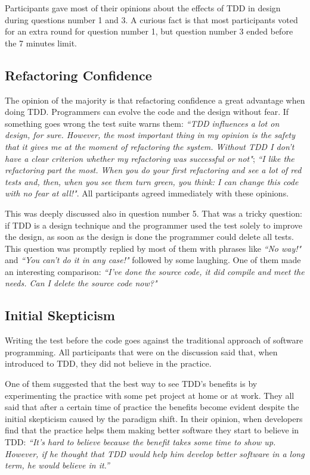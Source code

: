 Participants gave most of their opinions about the effects of TDD in design 
during questions number 1 and 3. 
A curious fact is that most participants voted for an extra round for
question number 1, but question number 3 ended before the 7 minutes limit.

\subsection{Refactoring Confidence}

The opinion of the majority is that refactoring confidence a great advantage
when doing TDD. Programmers can evolve the code and the design without fear. 
If something goes
wrong the test suite warns them: \textit{``TDD influences a lot on design,
for sure. However, the most important thing in my opinion is the safety that it
gives me at the moment of refactoring the system. Without TDD I don't have a
clear criterion whether my refactoring was successful or not"};
\textit{``I like the refactoring part the most.
When you do your first refactoring and see a lot of red tests and, then, when
you see them turn green, you think: I can change this code with no fear at
all!"}.
All participants agreed immediately with these opinions.

This was deeply discussed also in question number 5. That was a tricky question:
if TDD is a design technique and the programmer used the test solely to improve
the design, as soon as the design is done the programmer could delete all tests.
This question was promptly replied by most of them with phrases like 
\textit{``No way!"} and \textit{``You can't do it in any case!"} followed 
by some laughing. One of them made an interesting comparison: 
\textit{``I've done the source code, it did compile and meet the needs. Can I
delete the source code now?"}

\subsection{Initial Skepticism}

Writing the test before the code goes against the traditional approach of
software programming. 
All participants that were on the discussion said that, when introduced to TDD,
they did not believe in the practice.

One of them suggested that the best way to see TDD's benefits is by
experimenting the practice with some pet project at home or at work.
They all said that after a certain time of practice the benefits become evident
despite the initial skepticism caused by the paradigm shift.
In their opinion, when developers find that the practice helps them making
better software they start to believe in TDD: \textit{``It's hard to believe
because the benefit takes some time to show up. However, if he thought that TDD
would help him develop better software in a long term, he would believe in it.''}

